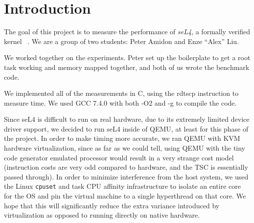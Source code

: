 \section{Introduction}
The goal of this project is to measure the performance of \textit{seL4},
a formally verified kernel ~\cite{klein2009sel4}. 
We are a group of two students: Peter Amidon and Enze ``Alex'' Liu. 

We worked together on the experiments. Peter set up the boilerplate to
get a root task working and memory mapped together, and both of us wrote the
benchmark code.

We implemented all of the measurements in C, using the rdtscp
instruction to measure time.  We used GCC 7.4.0 with both -O2 and -g
to compile the code.

Since seL4 is difficult to run on real hardware, due to its extremely
limited device driver support, we decided to run seL4 inside of QEMU,
at least for this phase of the project. In order to make timing more
accurate, we ran QEMU with KVM hardware virtualization, since as far
as we could tell, using QEMU with the tiny code generator emulated
processor would result in a very strange cost model (instruction costs
are very odd compared to hardware, and the TSC is essentially passed
through). In order to minimize interference from the host system, we
used the Linux \verb|cpuset| and task CPU affinity infrastructure to
isolate an entire core for the OS and pin the virtual machine to a
single hyperthread on that core. We hope that this will significantly
reduce the extra variance introduced by virtualization as opposed to
running directly on native hardware.
